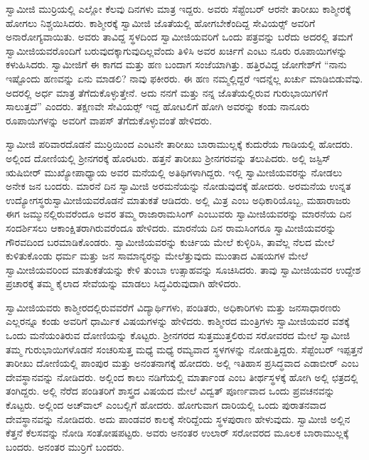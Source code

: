  ಸ್ವಾಮೀಜಿ ಮುರ‍್ರಿಯಲ್ಲಿ ಎಲ್ಲೋ ಕೆಲವು ದಿನಗಳು ಮಾತ್ರ ಇದ್ದರು. ಅವರು ಸೆಪ್ಟೆಂಬರ್ ಆರನೇ ತಾರೀಖು ಕಾಶ್ಮೀರಕ್ಕೆ ಹೋಗಲು ನಿಶ್ಚಯಿಸಿದರು. ಕಾಶ್ಮೀರಕ್ಕೆ ಸ್ವಾಮೀಜಿ ಜೊತೆಯಲ್ಲಿ ಹೋಗಬೇಕೆಂದಿದ್ದ ಸೇವಿಯರ್ಸ್‍‍ ಅವರಿಗೆ ಅನಾರೋಗ್ಯವಾಯಿತು. ಅವರು ತಾವಿದ್ದ ಸ್ಥಳದಿಂದ ಸ್ವಾಮೀಜಿಯವರಿಗೆ ಒಂದು ಪತ್ರವನ್ನು ಬರೆದು ಅದರಲ್ಲಿ ತಮಗೆ ಸ್ವಾಮೀಜಿಯವರೊಂದಿಗೆ ಬರುವುದಕ್ಕಾಗುವುದಿಲ್ಲವೆಂದು ತಿಳಿಸಿ ಅವರ ಖರ್ಚಿಗೆ ಎಂಟು ನೂರು ರೂಪಾಯಿಗಳನ್ನು ಕಳುಹಿಸಿದರು. ಸ್ವಾಮೀಜಿಗೆ ಈ ಕಾಗದ ಮತ್ತು ಹಣ ಬಂದಾಗ ಸಂಜೆಯಾಗಿತ್ತು. ಹತ್ತಿರವಿದ್ದ ಜೋಗೇಶ್‍ಗೆ “ನಾನು ಇಷ್ಟೊಂದು ಹಣವನ್ನು ಏನು ಮಾಡಲಿ? ನಾವು ಫಕೀರರು. ಈ ಹಣ ನಮ್ಮಲ್ಲಿದ್ದರೆ ಇದನ್ನೆಲ್ಲ ಖರ್ಚು ಮಾಡಿಬಿಡುವೆವು. ಅದರಲ್ಲಿ ಅರ್ಧ ಮಾತ್ರ ತೆಗೆದುಕೊಳ್ಳುತ್ತೇನೆ. ಅದು ನನಗೆ ಮತ್ತು ನನ್ನ ಜೊತೆಯಲ್ಲಿರುವ ಗುರುಭಾಯಿಗಳಿಗೆ ಸಾಲುತ್ತದೆ” ಎಂದರು. ತಕ್ಷಣವೇ ಸೇವಿಯರ್ಸ್‍‍ ಇದ್ದ ಹೋಟಲಿಗೆ ಹೋಗಿ ಅವರನ್ನು ಕಂಡು ನಾನೂರು ರೂಪಾಯಿಗಳನ್ನು ಅವರಿಗೆ ವಾಪಸ್ ತೆಗೆದುಕೊಳ್ಳುವಂತೆ ಹೇಳಿದರು. 

 ಸ್ವಾಮೀಜಿ ಪರಿವಾರದೊಡನೆ ಮುರ‍್ರಿಯಿಂದ ಎಂಟನೇ ತಾರೀಖು ಬಾರಾಮುಲ್ಲಕ್ಕೆ ಕುದುರೆಯ ಗಾಡಿಯಲ್ಲಿ ಹೋದರು. ಅಲ್ಲಿಂದ ದೋಣಿಯಲ್ಲಿ ಶ‍್ರೀನಗರಕ್ಕೆ ಹೊರಟರು. ಹತ್ತನೆ ತಾರೀಖು ಶ‍್ರೀನಗರವನ್ನು ತಲುಪಿದರು. ಅಲ್ಲಿ ಜಸ್ಟಿಸ್ ಋಷಿಬೀರ್ ಮುಖ್ಯೋಪಾಧ್ಯಾಯ ಅವರ ಮನೆಯಲ್ಲಿ ಅತಿಥಿಗಳಾಗಿದ್ದರು. ಇಲ್ಲಿ ಸ್ವಾಮೀಜಿಯವರನ್ನು ನೋಡಲು ಅನೇಕ ಜನ ಬಂದರು. ಮಾರನೆ ದಿನ ಸ್ವಾಮೀಜಿ ಅರಮನೆಯನ್ನು ನೋಡುವುದಕ್ಕೆ ಹೋದರು. ಅರಮನೆಯ ಉನ್ನತ ಉದ್ಯೋಗಸ್ಥರು\break ಸ್ವಾಮೀಜಿಯವರೊಡನೆ ಮಾತುಕತೆ ಆಡಿದರು. ಅಲ್ಲಿ ಮಿತ್ರ ಎಂಬ ಅಧಿಕಾರಿಯೊಬ್ಬ, ಮಹಾರಾಜರು ಈಗ ಜಮ್ಮುನಲ್ಲಿರುವರೆಂದೂ ಅವರ ತಮ್ಮ ರಾಜಾರಾಮಸಿಂಗ್ ಎಂಬುವರು ಸ್ವಾಮೀಜಿಯವರನ್ನು ಮಾರನೆಯ ದಿನ ಸಂದರ್ಶಿಸಲು ಆಕಾಂಕ್ಷಿತರಾಗಿರುವರೆಂದೂ ಹೇಳಿದರು. ಮಾರನೆಯ ದಿನ ರಾಮಸಿಂಗರೂ ಸ್ವಾಮೀಜಿಯವರನ್ನು ಗೌರವದಿಂದ ಬರಮಾಡಿಕೊಂಡರು. ಸ್ವಾಮೀಜಿಯವರನ್ನು ಕುರ್ಚಿಯ ಮೇಲೆ ಕುಳ್ಳಿರಿಸಿ, ತಾವೆಲ್ಲ ನೆಲದ ಮೇಲೆ ಕುಳಿತುಕೊಂಡು ಧರ್ಮ ಮತ್ತು ಜನ ಸಾಮಾನ್ಯರನ್ನು ಮೇಲೆತ್ತುವುದು ಮುಂತಾದ ವಿಷಯಗಳ ಮೇಲೆ ಸ್ವಾಮೀಜಿಯವರಿಂದ ಮಾತುಕತೆಯನ್ನು ಕೇಳಿ ತುಂಬಾ ಉತ್ಸಾಹವನ್ನು ಸೂಚಿಸಿದರು. ತಾವು ಸ್ವಾಮೀಜಿಯವರ ಉದ್ದೇಶ ಪ್ರಚಾರಕ್ಕೆ ತಮ್ಮ ಕೈಲಾದ ಸೇವೆಯನ್ನು ಮಾಡಲು ಸಿದ್ಧವಿರುವುದಾಗಿ ಹೇಳಿದರು. 

 ಸ್ವಾಮೀಜಿಯವರು ಕಾಶ್ಮೀರದಲ್ಲಿರುವವರೆಗೆ ವಿದ್ಯಾರ್ಥಿಗಳು, ಪಂಡಿತರು, ಅಧಿಕಾರಿಗಳು ಮತ್ತು ಜನಸಾಧಾರಣರು ಎಲ್ಲರನ್ನೂ ಕಂಡು ಅವರಿಗೆ ಧಾರ್ಮಿಕ ವಿಷಯಗಳನ್ನು ಹೇಳಿದರು. ಕಾಶ್ಮೀರದ ಮಂತ್ರಿಗಳು ಸ್ವಾಮೀಜಿಯವರ ವಶಕ್ಕೆ ಒಂದು ಮನೆಯಂತಿರುವ ದೋಣಿಯನ್ನು ಕೊಟ್ಟರು. ಶ‍್ರೀನಗರದ ಸುತ್ತಮುತ್ತಲಿರುವ ಸರೋವರದ ಮೇಲೆ ಸ್ವಾಮೀಜಿ ತಮ್ಮ ಗುರುಭಾಯಿಗಳೊಡನೆ ಸಂಚರಿಸುತ್ತ ಮಧ್ಯೆ ಮಧ್ಯೆ ರಮ್ಯವಾದ ಸ್ಥಳಗಳನ್ನು ನೋಡುತ್ತಿದ್ದರು. ಸೆಪ್ಟೆಂಬರ್ ಇಪ್ಪತ್ತನೆ ತಾರೀಖು ದೋಣಿಯಲ್ಲಿ ಪಾಂಪುರ ಮತ್ತು ಅನಂತನಾಗಕ್ಕೆ ಹೋದರು. ಅಲ್ಲಿ ಇತಿಹಾಸ ಪ್ರಸಿದ್ಧವಾದ ಎಡಾಬೀರ್ ಎಂಬ ದೇವಸ್ಥಾನವನ್ನು ನೋಡಿದರು. ಅಲ್ಲಿಂದ ಕಾಲು ನಡಿಗೆಯಲ್ಲಿ ಮಾರ್ತಾಂಡ ಎಂಬ ತೀರ್ಥಸ್ಥಳಕ್ಕೆ ಹೋಗಿ ಅಲ್ಲಿ ಛತ್ರದಲ್ಲಿ ತಂಗಿದ್ದರು. ಅಲ್ಲಿ ನೆರೆದ ಪಂಡಿತರಿಗೆ ಶಾಸ್ತ್ರದ ವಿಷಯದ ಮೇಲೆ ವಿದ್ವತ್ ಪೂರ್ಣವಾದ ಒಂದು ಪ್ರವಚನವನ್ನು ಕೊಟ್ಟರು. ಅಲ್ಲಿಂದ ಅಚ್‍ವಾಲ್ ಎಂಬಲ್ಲಿಗೆ ಹೋದರು. ಹೋಗುವಾಗ ದಾರಿಯಲ್ಲಿ ಒಂದು ಪುರಾತನವಾದ ದೇವಸ್ಥಾನವನ್ನು ನೋಡಿದರು. ಅದು ಪಾಂಡವರ ಕಾಲಕ್ಕೆ ಸೇರಿದ್ದೆಂದು ಸ್ಥಳಪುರಾಣ ಹೇಳುವುದು. ಸ್ವಾಮೀಜಿ ಅಲ್ಲಿನ ಕೆತ್ತನೆ ಕೆಲಸವನ್ನು ನೋಡಿ ಸಂತೋಷಪಟ್ಟರು. ಅವರು ಅನಂತರ ಉಲಾರ್ ಸರೋವರದ ಮೂಲಕ ಬಾರಾಮುಲ್ಲಕ್ಕೆ ಬಂದರು. ಅನಂತರ ಮುರ‍್ರಿಗೆ ಬಂದರು. 

